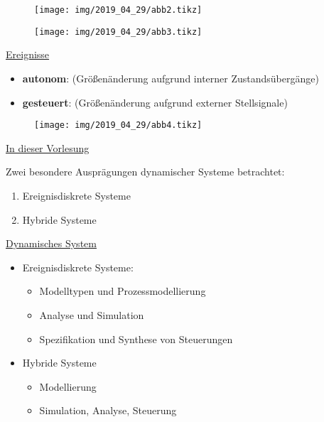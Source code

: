 


\begin{figure}[H]
	\centering
	\texttt{[image: img/2019\_04\_29/abb2.tikz]}
\end{figure}

\begin{figure}[H]
	\centering
	\texttt{[image: img/2019\_04\_29/abb3.tikz]}
\end{figure}

\underline{Ereignisse}
\begin{itemize}
	\item \textbf{autonom}: (Größenänderung aufgrund interner Zustandsübergänge)
	\item \textbf{gesteuert}: (Größenänderung aufgrund externer Stellsignale)
\end{itemize}


\begin{figure}[H]
	\centering
	\texttt{[image: img/2019\_04\_29/abb4.tikz]}
\end{figure}

\underline{In dieser Vorlesung}

Zwei besondere Ausprägungen dynamischer Systeme betrachtet:
\begin{enumerate}
	\item Ereignisdiskrete Systeme
	\item Hybride Systeme 
\end{enumerate}

\underline{Dynamisches System}

\begin{figure}[H]
	\centering
\end{figure}


\begin{itemize}
	\item Ereignisdiskrete Systeme: 
	\begin{itemize}
		\item Modelltypen und Prozessmodellierung
		\item Analyse und Simulation
		\item Spezifikation und Synthese von Steuerungen
	\end{itemize}
	\item Hybride Systeme
	\begin{itemize}
		\item Modellierung
		\item Simulation, Analyse, Steuerung
	\end{itemize} 
\end{itemize}

